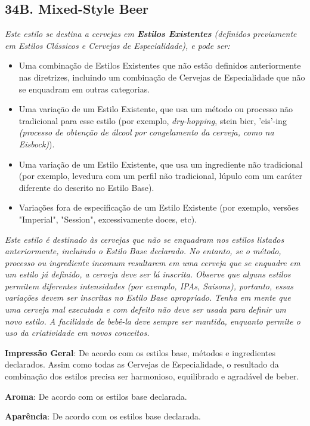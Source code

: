\subsection*{34B. Mixed-Style Beer}
\textit{Este estilo se destina a cervejas em \textbf{Estilos Existentes} (definidos previamente em Estilos Clássicos e Cervejas de Especialidade), e pode ser:}
\begin{itemize}
  \item Uma combinação de Estilos Existentes que não estão definidos anteriormente nas diretrizes, incluindo um combinação de Cervejas de Especialidade que não se enquadram em outras categorias.
  \item Uma variação de um Estilo Existente, que usa um método ou processo não tradicional para esse estilo (por exemplo, \textit{dry-hopping}, stein bier, 'eis'-ing \textit{(processo de obtenção de álcool por congelamento da cerveja, como na Eisbock)}).
  \item Uma variação de um Estilo Existente, que usa um ingrediente não tradicional (por exemplo, levedura com um perfil não tradicional, lúpulo com um caráter diferente do descrito no Estilo Base).
  \item Variações fora de especificação de um Estilo Existente (por exemplo, versões "Imperial", "Session", excessivamente doces, etc).
\end{itemize}
\textit{Este estilo é destinado às cervejas que não se enquadram nos estilos listados anteriormente, incluindo o Estilo Base declarado. No entanto, se o método, processo ou ingrediente incomum resultarem em uma cerveja que se enquadre em um estilo já definido, a cerveja deve ser lá inscrita. Observe que alguns estilos permitem diferentes intensidades (por exemplo, IPAs, Saisons), portanto, essas variações devem ser inscritas no Estilo Base apropriado.}
\textit{Tenha em mente que uma cerveja mal executada e com defeito não deve ser usada para definir um novo estilo. A facilidade de bebê-la deve sempre ser mantida, enquanto permite o uso da criatividade em novos conceitos.}

\textbf{Impressão Geral}: De acordo com os estilos base, métodos e ingredientes declarados. Assim como todas as Cervejas de Especialidade, o resultado da combinação dos estilos precisa ser harmonioso, equilibrado e agradável de beber.

\textbf{Aroma}: De acordo com os estilos base declarada.

\textbf{Aparência}: De acordo com os estilos base declarada.

